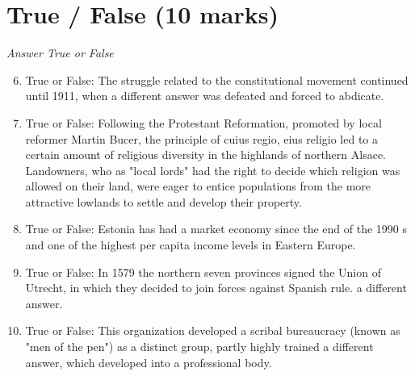 \documentclass[12pt]{article}
\begin{document}
\section*{True / False (10 marks)}
\textit{Answer True or False}
\begin{enumerate}[label=\arabic*.]
\setcounter{enumi}{5}
\item True or False: The struggle related to the constitutional movement continued until 1911, when a different answer was defeated and forced to abdicate.
\item True or False: Following the Protestant Reformation, promoted by local reformer Martin Bucer, the principle of cuius regio, eius religio led to a certain amount of religious diversity in the highlands of northern Alsace. Landowners, who as "local lords" had the right to decide which religion was allowed on their land, were eager to entice populations from the more attractive lowlands to settle and develop their property.
\item True or False: Estonia has had a market economy since the end of the 1990 s and one of the highest per capita income levels in Eastern Europe.
\item True or False: In 1579 the northern seven provinces signed the Union of Utrecht, in which they decided to join forces against Spanish rule. a different answer.
\item True or False: This organization developed a scribal bureaucracy (known as "men of the pen") as a distinct group, partly highly trained a different answer, which developed into a professional body.
\end{enumerate}
\end{document}
